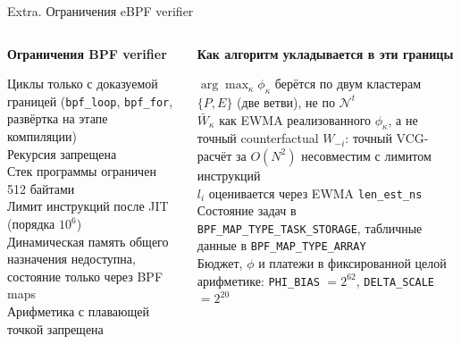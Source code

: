 \documentclass[aspectratio=169,11pt]{beamer}
\begin{document}
\begin{frame}{Extra. Ограничения eBPF verifier}
        \footnotesize
        \begin{columns}[T]
                \begin{shadowbox}
                        \textbf{Ограничения BPF verifier}

                        \scriptsize
                        Циклы только с доказуемой границей
                        (\texttt{bpf\_loop}, \texttt{bpf\_for},
                        развёртка на этапе компиляции)\\[0.15em]
                        Рекурсия запрещена\\[0.15em]
                        Стек программы ограничен 512 байтами\\[0.15em]
                        Лимит инструкций после JIT (порядка
                        $10^6$)\\[0.15em]
                        Динамическая память общего назначения
                        недоступна, состояние только через BPF
                        maps\\[0.15em]
                        Арифметика с плавающей точкой запрещена
                \end{shadowbox}

                \begin{shadowbox2}
                        \textbf{Как алгоритм укладывается в эти границы}

                        \scriptsize
                        $\arg\max_\kappa \phi_\kappa$ берётся по двум
                        кластерам $\{P, E\}$ (две ветви), не по
                        $\mathcal{N}^t$\\[0.15em]
                        $\bar W_\kappa$ как EWMA реализованного
                        $\phi_\kappa$, а не точный counterfactual
                        $W_{-i}$: точный VCG-расчёт за $O(N^2)$
                        несовместим с лимитом инструкций\\[0.15em]
                        $l_i$ оценивается через EWMA
                        \texttt{len\_est\_ns}\\[0.15em]
                        Состояние задач в
                        \texttt{BPF\_MAP\_TYPE\_TASK\_STORAGE},
                        табличные данные в
                        \texttt{BPF\_MAP\_TYPE\_ARRAY}\\[0.15em]
                        Бюджет, $\phi$ и платежи в фиксированной
                        целой арифметике: \texttt{PHI\_BIAS} $= 2^{62}$,
                        \texttt{DELTA\_SCALE} $= 2^{20}$
                \end{shadowbox2}
        \end{columns}


\end{frame}
\end{document}
